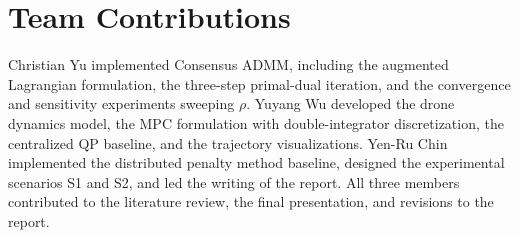 \documentclass[11pt,onecolumn]{article}
\begin{document}
\section{Team Contributions}
\label{sec:contributions}

Christian Yu implemented Consensus ADMM, including the augmented Lagrangian formulation,
the three-step primal-dual iteration, and the convergence and sensitivity experiments
sweeping $\rho$.  Yuyang Wu developed the drone dynamics model, the MPC formulation with
double-integrator discretization, the centralized QP baseline, and the trajectory
visualizations.  Yen-Ru Chin implemented the distributed penalty method baseline,
designed the experimental scenarios S1 and S2, and led the writing of the report.  All
three members contributed to the literature review, the final presentation, and
revisions to the report.



\end{document}
